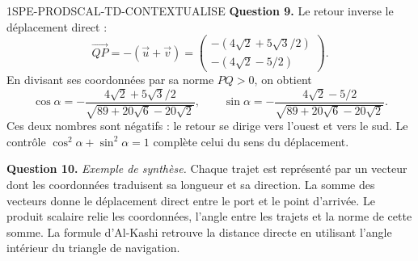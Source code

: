 \begin{corrige}{1SPE-PRODSCAL-TD-CONTEXTUALISE}
\textbf{Question 9.}
Le retour inverse le déplacement direct :
\[
\overrightarrow{QP}=-(\vec u+\vec v)
=\begin{pmatrix}-(4\sqrt2+5\sqrt3/2)\\-(4\sqrt2-5/2)\end{pmatrix}.
\]
En divisant ses coordonnées par sa norme $PQ>0$, on obtient
\[
\cos\alpha=-\frac{4\sqrt2+5\sqrt3/2}{\sqrt{89+20\sqrt6-20\sqrt2}},
\qquad
\sin\alpha=-\frac{4\sqrt2-5/2}{\sqrt{89+20\sqrt6-20\sqrt2}}.
\]
Ces deux nombres sont négatifs : le retour se dirige vers l'ouest et vers le sud.
Le contrôle $\cos^2\alpha+\sin^2\alpha=1$ complète celui du sens du déplacement.

\textbf{Question 10.}
\emph{Exemple de synthèse.}
Chaque trajet est représenté par un vecteur dont les coordonnées traduisent sa longueur et sa direction.
La somme des vecteurs donne le déplacement direct entre le port et le point d'arrivée.
Le produit scalaire relie les coordonnées, l'angle entre les trajets et la norme de cette somme.
La formule d'Al-Kashi retrouve la distance directe en utilisant l'angle intérieur du triangle de navigation.
\end{corrige}
\fi
